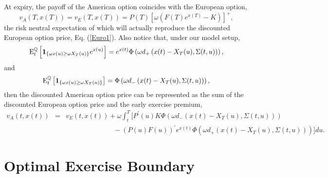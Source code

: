 \documentclass[12pt]{article}
\begin{document}
    At expiry, the payoff of the American option coincides with the European option,
    \begin{equation}
      v_A(T,x(T)) = v_E(T,x(T))=P(T)\left[\omega\left(F(T)e^{x(T)}-K\right)\right]^+,
    \end{equation}
    the risk neutral expectation of which will actually reproduce the discounted European option price, Eq. (\ref{Euro1}).
    Also notice that, under our model setup,
    \begin{equation}
      {\rm E}_t^{\mathbb{Q}}\left[\mathbf{1}_{\{\omega x(u)\geq\omega X_T(u)\}}e^{x(u)}\right]
       = e^{x(t)}\Phi\left(\omega d_+\left(x(t)-X_T(u), \Sigma(t,u)\right)\right),
    \end{equation}
    and
    \begin{equation}
      {\rm E}_t^{\mathbb{Q}}\left[\mathbf{1}_{\{\omega x(u)\geq\omega X_T(u)\}}\right]
       = \Phi\left(\omega d_-\left(x(t)-X_T(u), \Sigma(t,u)\right)\right),
    \end{equation}
    then the discounted American option price can be represented as the sum of the discounted European
    option price and the early exercise premium,
    \begin{eqnarray}
      \label{EEP}
      v_A(t,x(t))&=&v_E(t,x(t))+\omega\int_t^T\bigg[P^{\prime}(u)K\Phi\left(\omega d_-\left(x(t)-X_T(u), \Sigma(t,u)\right)\right)\nonumber\\
                 &&\quad\quad\quad\quad\quad\quad\quad
                  -\left(P(u)F(u)\right)^{\prime}e^{x(t)}\Phi\left(\omega d_+\left(x(t)-X_T(u), \Sigma(t,u)\right)\right)\bigg]du.
    \end{eqnarray}

  \section{Optimal Exercise Boundary}
\end{document}

